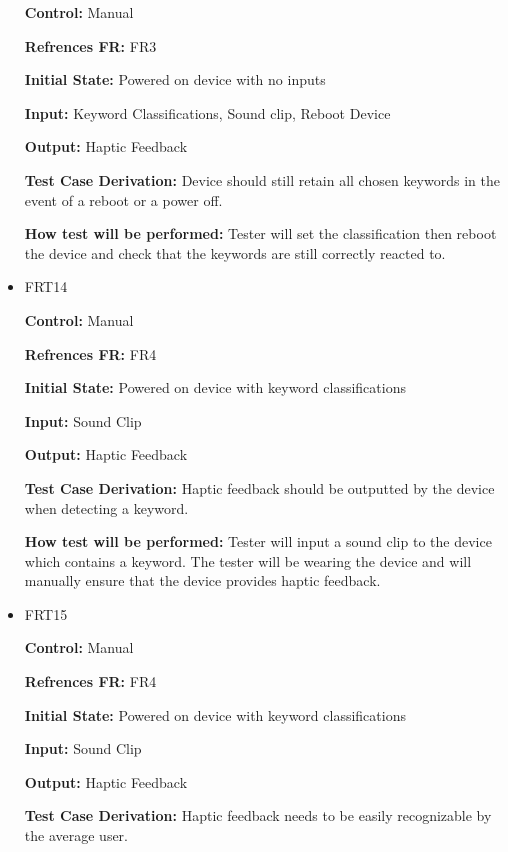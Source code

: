 \documentclass[12pt, titlepage]{article}
\begin{document}
\begin{itemize}
\textbf{Control:} Manual

\textbf{Refrences FR:} FR3 					

\textbf{Initial State:} Powered on device with no inputs
					
\textbf{Input:} Keyword Classifications, Sound clip, Reboot Device
					
\textbf{Output:} Haptic Feedback

\textbf{Test Case Derivation:} Device should still retain all chosen keywords in the event of a reboot or a power off.
					
\textbf{How test will be performed:} Tester will set the classification then reboot the device and check that the keywords are still correctly reacted to. 


\item{FRT14}

\textbf{Control:} Manual

\textbf{Refrences FR:} FR4 					

\textbf{Initial State:} Powered on device with keyword classifications
					
\textbf{Input:} Sound Clip
					
\textbf{Output:} Haptic Feedback

\textbf{Test Case Derivation:} Haptic feedback should be outputted by the device when detecting a keyword.
					
\textbf{How test will be performed:} Tester will input a sound clip to the device which contains a keyword. The tester will be wearing the device and will manually ensure that the device provides haptic feedback. 


\item{FRT15}

\textbf{Control:} Manual

\textbf{Refrences FR:} FR4 					

\textbf{Initial State:} Powered on device with keyword classifications
					
\textbf{Input:} Sound Clip
					
\textbf{Output:} Haptic Feedback

\textbf{Test Case Derivation:} Haptic feedback needs to be easily recognizable by the average user.
					

\end{itemize}
\end{document}
